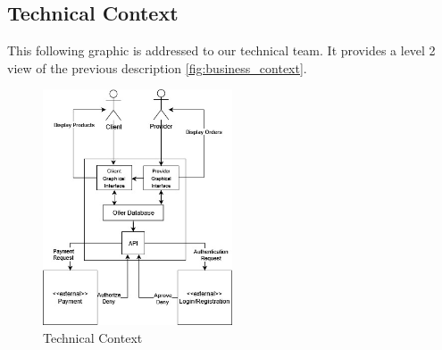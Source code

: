 \subsection{Technical Context}

This following graphic is addressed to our technical team. It provides a level 2 view of the previous description
\ref{fig:business_context}.

\begin{figure}[H]
    \centering
    \includegraphics[width=0.5\textwidth]{assets/technical_context.jpg}
    \caption{Technical Context}
    \label{fig:technical_context}
\end{figure}


